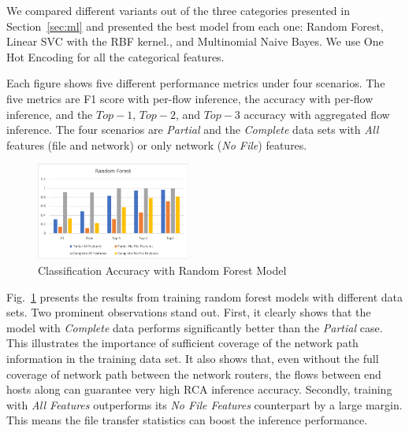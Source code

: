 We compared different variants out of the three categories presented in Section~\ref{sec:ml} and presented the best model from each one: Random Forest, Linear SVC with the RBF kernel., and Multinomial Naive Bayes.
We use One Hot Encoding for all the categorical features. 

Each figure shows five different performance metrics under four scenarios. The five metrics are F1 score with per-flow inference, the accuracy with per-flow inference, and the $Top-1$, $Top-2$, and $Top-3$ accuracy with
aggregated flow inference. The four scenarios are {\it Partial} and the {\it Complete} data sets with {\it All} features (file and network) or only network ({\it No File}) features.

\begin{figure}[!ht]
\begin{center}
\includegraphics[width=0.45\textwidth]{./figure/rf-accuracy}
\end{center}
\vspace{-0.05in}
\caption{Classification Accuracy with Random Forest Model}
\vspace{-0.05in}
\label{fig:dt}
\end{figure}

Fig.~\ref{fig:dt} presents the results from training random forest models with different data sets. Two prominent observations stand out. 
First, it clearly shows that the model with {\it Complete} data performs significantly better than the {\it Partial} case. This illustrates the importance of sufficient 
coverage of the network path information in the training data set. It also shows that, even without the full coverage of network path between the network routers, 
the flows between end hosts along can guarantee very high RCA inference accuracy.   
Secondly, training with {\it All Features} outperforms its {\it No File Features} counterpart by a large margin. This means the file transfer statistics can boost the inference performance.  

